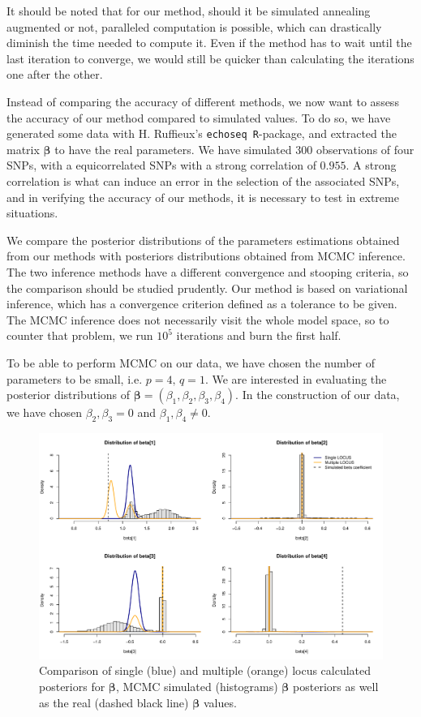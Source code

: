 \documentclass[a4paper, 11pt]{report}
\numberwithin{equation}{chapter}
\begin{document}
It should be noted that for our method, should it be simulated annealing augmented or not, paralleled computation is possible, which can drastically diminish the time needed to compute it. Even if the method has to wait until the last iteration to converge, we would still be quicker than calculating the iterations one after the other.

Instead of comparing the accuracy of different methods, we now want to assess the accuracy of our method compared to simulated values. To do so, we have generated some data with H. Ruffieux's \texttt{echoseq R}-package, and extracted the matrix $\boldsymbol{\beta}$ to have the real parameters. We have simulated $300$ observations of four SNPs, with a equicorrelated SNPs with a strong correlation of $0.955$. A strong correlation is what can induce an error in the selection of the associated SNPs, and in verifying the accuracy of our methods, it is necessary to test in extreme situations.

We compare the posterior distributions of the parameters estimations obtained from our methods with posteriors distributions obtained from MCMC inference. The two inference methods have a different convergence and stooping criteria, so the comparison should be studied prudently. Our method is based on variational inference, which has a convergence criterion defined as a tolerance to be given. The MCMC inference does not necessarily visit the whole model space, so to counter that problem, we run $10^5$ iterations and burn the first half.

To be able to perform MCMC on our data, we have chosen the number of parameters to be small, i.e. $p=4,\, q=1$. We are interested in evaluating the posterior distributions of $\boldsymbol{\beta} = (\beta_1, \beta_2, \beta_3, \beta_4)$. In the construction of our data, we have chosen $\beta_2, \beta_3 = 0$ and $\beta_1, \beta_4 \neq 0$.
\begin{figure}[h]
\includegraphics[width=\textwidth, bb=0 0 800px 600px]{images/no_annealing.pdf}
\caption{\label{fig:no_ann}Comparison of single (blue) and multiple (orange) locus calculated posteriors for $\boldsymbol{\beta}$, MCMC simulated (histograms) $\boldsymbol{\beta}$ posteriors as well as the real (dashed black line) $\boldsymbol{\beta}$ values.}
\end{figure}
\end{document}
